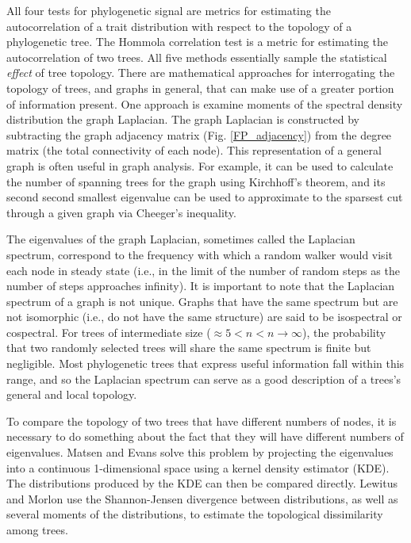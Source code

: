 All four tests for phylogenetic signal are metrics for estimating the autocorrelation of a trait distribution with respect to the topology of a phylogenetic tree. The Hommola correlation test is a metric for estimating the autocorrelation of two trees. All five methods essentially sample the statistical {\em effect} of tree topology. There are mathematical approaches for interrogating the topology of trees, and graphs in general, that can make use of a greater portion of information present. One approach is examine moments of the spectral density distribution the graph Laplacian. The graph Laplacian is constructed by subtracting the graph adjacency matrix (Fig. \ref{FP_adjacency}) from the degree matrix (the total connectivity of each node). This representation of a general graph is often useful in graph analysis. For example, it can be used to calculate the number of spanning trees for the graph using Kirchhoff's theorem, and its second second smallest eigenvalue can be used to approximate to the sparsest cut through a given graph via Cheeger's inequality. 



The eigenvalues of the graph Laplacian, sometimes called the Laplacian spectrum, correspond to the frequency with which a random walker would visit each node in steady state (i.e., in the limit of the number of random steps as the number of steps approaches infinity). It is important to note that the Laplacian spectrum of a graph is not unique. Graphs that have the same spectrum but are not isomorphic (i.e., do not have the same structure) are said to be isospectral or cospectral. For trees of intermediate size ($ \approx 5 < n < n \rightarrow \infty$), the probability that two randomly selected trees will share the same spectrum is finite but negligible. \cite{matsen2012ubiquity} Most phylogenetic trees that express useful information fall within this range, and so the Laplacian spectrum can serve as a good description of a trees's general and local topology.

To compare the topology of two trees that have different numbers of nodes, it is necessary to do something about the fact that they will have different numbers of eigenvalues. Matsen and Evans \cite{matsen2012ubiquity} solve this problem by projecting the eigenvalues into a continuous 1-dimensional space using a kernel density estimator (KDE). The distributions produced by the KDE can then be compared directly. Lewitus and Morlon \cite{lewitus2015characterizing} use the Shannon-Jensen divergence between distributions, as well as several moments of the distributions, to estimate the topological dissimilarity among trees.  

